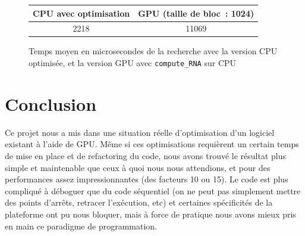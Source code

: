 \documentclass{article}
\begin{document}
\begin{figure}[H]
\centering
\begin{tabular}{|c|c|}
    \hline
    CPU avec optimisation & GPU (taille de bloc~: 1024) \\
    \hline
    2218 & 11069 \\
    \hline
\end{tabular}
\caption{Temps moyen en microsecondes de la recherche avec la version CPU optimisée, et la version GPU avec \texttt{compute\_RNA} sur CPU}
\label{fig:honest_comp}
\end{figure}

\section{Conclusion}

Ce projet nous a mis dans une situation réelle d'optimisation d'un logiciel existant à l'aide de GPU. Même si ces optimisations requièrent un certain temps de mise en place et de refactoring du code, nous avons trouvé le résultat plus simple et maintenable que ceux à quoi nous nous attendions, et pour des performances assez impressionnantes (des facteurs 10 ou 15). Le code est plus compliqué à déboguer que du code séquentiel (on ne peut pas simplement mettre des points d'arrêts, retracer l'exécution, etc) et certaines spécificités de la plateforme ont pu nous bloquer, mais à force de pratique nous avons mieux pris en main ce paradigme de programmation.
\end{document}
